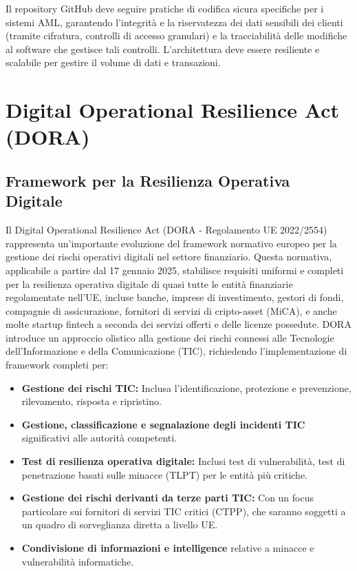 Il repository GitHub deve seguire pratiche di codifica sicura specifiche per i sistemi AML, garantendo l'integrità e la riservatezza dei dati sensibili dei clienti (tramite cifratura, controlli di accesso granulari) e la tracciabilità delle modifiche al software che gestisce tali controlli. L'architettura deve essere resiliente e scalabile per gestire il volume di dati e transazioni.

\section{Digital Operational Resilience Act (DORA)}
\label{sec:dora}

\subsection{Framework per la Resilienza Operativa Digitale}
Il Digital Operational Resilience Act (DORA - Regolamento UE 2022/2554) rappresenta un'importante evoluzione del framework normativo europeo per la gestione dei rischi operativi digitali nel settore finanziario. Questa normativa, applicabile a partire dal 17 gennaio 2025, stabilisce requisiti uniformi e completi per la resilienza operativa digitale di quasi tutte le entità finanziarie regolamentate nell'UE, incluse banche, imprese di investimento, gestori di fondi, compagnie di assicurazione, fornitori di servizi di cripto-asset (MiCA), e anche molte startup fintech a seconda dei servizi offerti e delle licenze possedute. DORA introduce un approccio olistico alla gestione dei rischi connessi alle Tecnologie dell'Informazione e della Comunicazione (TIC), richiedendo l'implementazione di framework completi per:
\begin{itemize}
    \item \textbf{Gestione dei rischi TIC:} Inclusa l'identificazione, protezione e prevenzione, rilevamento, risposta e ripristino.
    \item \textbf{Gestione, classificazione e segnalazione degli incidenti TIC} significativi alle autorità competenti.
    \item \textbf{Test di resilienza operativa digitale:} Inclusi test di vulnerabilità, test di penetrazione basati sulle minacce (TLPT) per le entità più critiche.
    \item \textbf{Gestione dei rischi derivanti da terze parti TIC:} Con un focus particolare sui fornitori di servizi TIC critici (CTPP), che saranno soggetti a un quadro di sorveglianza diretta a livello UE.
    \item \textbf{Condivisione di informazioni e intelligence} relative a minacce e vulnerabilità informatiche.
\end{itemize}
